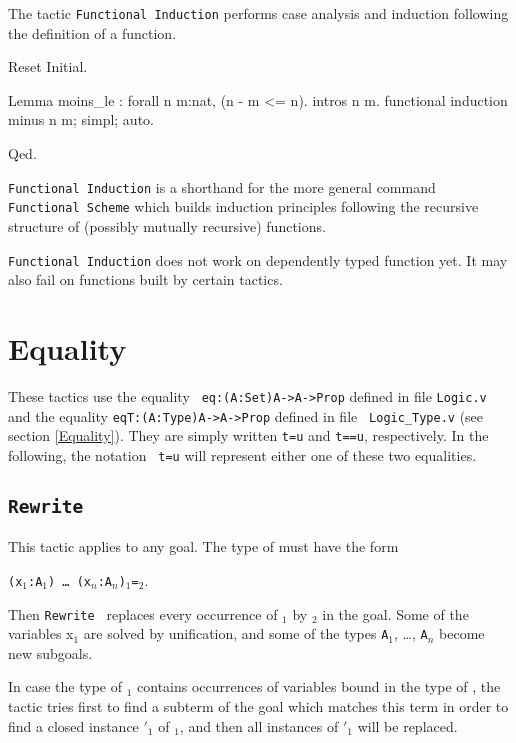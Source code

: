 The tactic \texttt{Functional Induction} performs case analysis
and induction following the definition of a function.

\begin{coq_eval}
Reset Initial.
\end{coq_eval}
\begin{coq_example}
Lemma moins_le : forall n m:nat, (n - m <= n).
intros n m.
functional induction minus n m; simpl; auto.
\end{coq_example}
\begin{coq_example*}
Qed.
\end{coq_example*}

\texttt{Functional Induction} is a shorthand for the more general
command \texttt{Functional Scheme} which builds induction
principles following the recursive structure of (possibly
mutually recursive) functions.

\texttt{Functional Induction} does not work on dependently typed
function yet. It may also fail on functions built by certain
tactics.

\SeeAlso{\ref{FunScheme},\ref{FunScheme-examples}}

\section{Equality}
These tactics use the equality {\tt
eq:(A:Set)A->A->Prop} defined in file {\tt Logic.v} and the equality
{\tt eqT:(A:Type)A->A->Prop} defined in file {\tt
Logic\_Type.v} (see section \ref{Equality}). They
are simply written {\tt t=u} and {\tt t==u},
respectively.  In the following, the notation {\tt
t=u} will represent either one of these two
equalities.

\subsection{\tt Rewrite \term}
\label{Rewrite}
This tactic applies to any goal. The type of {\term}
must have the form

\texttt{(x$_1$:A$_1$) \dots\ (x$_n$:A$_n$)}\term$_1${\tt =}\term$_2$. 

\noindent Then {\tt Rewrite \term} replaces every occurrence of 
\term$_1$ by \term$_2$ in the goal. Some of the variables x$_1$ are
solved by unification, and some of the types \texttt{A}$_1$, \dots,
\texttt{A}$_n$ become new subgoals.

\Rem In case the type of  
\term$_1$ contains occurrences of variables bound in the
type of \term, the tactic tries first to find a subterm of the goal
which matches this term in order to find a closed instance \term$'_1$
of \term$_1$, and then all instances of \term$'_1$ will be replaced.

